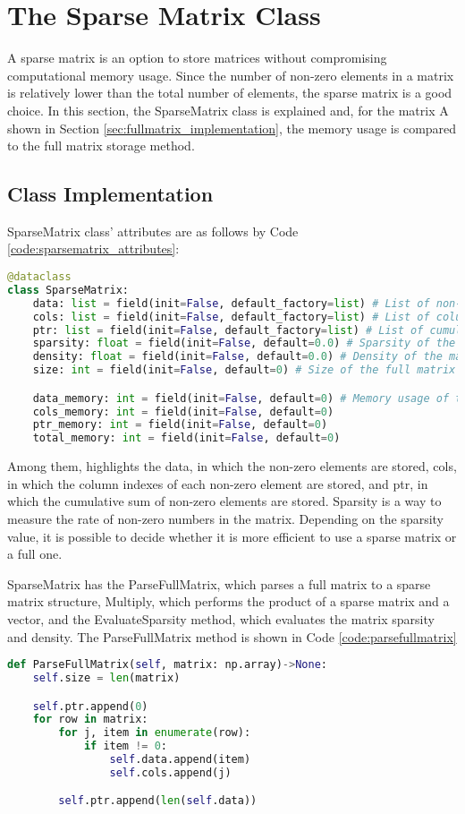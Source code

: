 \section{The Sparse Matrix Class}\label{sec:sparsematrix}
A sparse matrix is an option to store matrices without compromising computational memory usage. Since the number of non-zero elements in a matrix is relatively lower than the total number of elements, the sparse matrix is a good choice. In this section, the SparseMatrix class is explained and, for the matrix A shown in Section \ref{sec:fullmatrix_implementation}, the memory usage is compared to the full matrix storage method.
\subsection{Class Implementation} \label{sec:sparsematrix_implementation}
SparseMatrix class' attributes are as follows by Code \ref{code:sparsematrix_attributes}:
\begin{lstlisting}[language=python, caption={SparseMatrix Class Attributes}, label={code:sparsematrix_attributes}]
@dataclass
class SparseMatrix:
    data: list = field(init=False, default_factory=list) # List of non-zero elements
    cols: list = field(init=False, default_factory=list) # List of columns
    ptr: list = field(init=False, default_factory=list) # List of cumulative sums of non-zero elements
    sparsity: float = field(init=False, default=0.0) # Sparsity of the matrix
    density: float = field(init=False, default=0.0) # Density of the matrix
    size: int = field(init=False, default=0) # Size of the full matrix

    data_memory: int = field(init=False, default=0) # Memory usage of the data list
    cols_memory: int = field(init=False, default=0)
    ptr_memory: int = field(init=False, default=0)
    total_memory: int = field(init=False, default=0)
\end{lstlisting}    
Among them, highlights the data, in which the non-zero elements are stored, cols, in which the column indexes of each non-zero element are stored, and ptr, in which the cumulative sum of non-zero elements are stored. Sparsity is a way to measure the rate of non-zero numbers in the matrix. Depending on the sparsity value, it is possible to decide whether it is more efficient to use a sparse matrix or a full one. 

SparseMatrix has the ParseFullMatrix, which parses a full matrix to a sparse matrix structure, Multiply, which performs the product of a sparse matrix and a vector, and the EvaluateSparsity method, which evaluates the matrix sparsity and density. The ParseFullMatrix method is shown in Code \ref{code:parsefullmatrix}
\begin{lstlisting}[language=python, caption={ParseFullMatrix Method}, label={code:parsefullmatrix}]
def ParseFullMatrix(self, matrix: np.array)->None:
    self.size = len(matrix)

    self.ptr.append(0)
    for row in matrix:
        for j, item in enumerate(row):
            if item != 0:
                self.data.append(item)
                self.cols.append(j)

        self.ptr.append(len(self.data))
\end{lstlisting}

